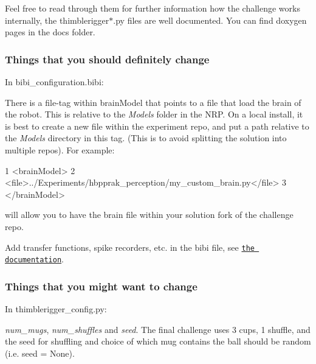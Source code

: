 Feel free to read through them for further information how the challenge works internally, the {\ttfamily thimblerigger$\ast$.py} files are well documented. You can find doxygen pages in the {\ttfamily docs} folder.

\subsubsection*{Things that you should definitely change}

In {\ttfamily bibi\+\_\+configuration.\+bibi}\+:


\begin{DoxyItemize}
\item There is a {\ttfamily file}-\/tag within {\ttfamily brain\+Model} that points to a file that load the brain of the robot. This is relative to the {\itshape Models} folder in the N\+RP. On a local install, it is best to create a new file within the experiment repo, and put a path relative to the {\itshape Models} directory in this tag. (This is to avoid splitting the solution into multiple repos). For example\+: 
\begin{DoxyCode}
1 <\textcolor{keywordtype}{brainModel}>
2     <\textcolor{keywordtype}{file}>../\textcolor{keyword}{Experiments}/\textcolor{keyword}{hbpprak\_perception}/\textcolor{keyword}{my\_custom\_brain.py}</\textcolor{keywordtype}{file}>
3 </\textcolor{keywordtype}{brainModel}>
\end{DoxyCode}
 will allow you to have the brain file within your solution fork of the challenge repo.
\item Add transfer functions, spike recorders, etc. in the bibi file, see \href{https://developer.humanbrainproject.eu/docs/projects/HBP%20Neurorobotics%20Platform/1.2/nrp/tutorials/transfer_function/bibi_config.html}{\tt the documentation}.
\end{DoxyItemize}

\subsubsection*{Things that you might want to change}

In {\ttfamily thimblerigger\+\_\+config.\+py}\+:
\begin{DoxyItemize}
\item {\itshape num\+\_\+mugs}, {\itshape num\+\_\+shuffles} and {\itshape seed}. The final challenge uses 3 cups, 1 shuffle, and the seed for shuffling and choice of which mug contains the ball should be random (i.\+e. {\ttfamily seed = None}).
\end{DoxyItemize}

